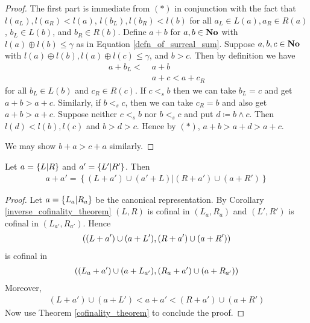 \begin{proof}
	The first part is immediate from $(*)$ in conjunction with the 
	fact that $l(a_L), l(a_R) < l(a)$, $l(b_L), l(b_R) < l(b)$
	for all $a_L \in L(a), a_R \in R(a)$, $b_L \in L(b)$, and 
	$b_R \in R(b)$. 
Define $a + b$ for $a, b \in \mathbf{No}$ with $l(a) \oplus l(b) \leq 
\gamma$ as in Equation \ref{defn_of_surreal_sum}. Suppose 
$a, b, c \in \mathbf{No}$ with $l(a) \oplus l(b), l(a) \oplus l(c) \leq 
\gamma$, and $b > c$. Then by definition we have 
\begin{align*}
	a + b_L < \;& a + b \\
	& a + c < a + c_R
\end{align*}
for all $b_L \in L(b)$ and $c_R \in R(c)$. If $c <_s b$ then 
we can take $b_L = c$ and get $a + b > a + c$. Similarly, if 
$b <_s c$, then we can take $c_R = b$ and also get $a + b > a + c$. 
Suppose neither $c <_s b$ nor $b <_s c$ and put 
$d \coloneq b \wedge c$. Then $l(d) < l(b), l(c)$ and 
$b > d > c$. Hence by $(*)$, $a + b > a + d > a + c$. 

We may show $b + a > c + a$ similarly. 
\end{proof}
\begin{lem}
	Let $a = \left\{ L \vert R \right\}$ and $a' = \left\{ L' \vert R' \right\}$. 
	Then
	\begin{align*}
		a + a' = 
		\left\{ (L + a') \cup (a' + L) \vert 
		(R + a') \cup (a + R') \right\}
	\end{align*}
\end{lem}
\begin{proof}
	Let $a = \left\{ L_a \vert R_a \right\}$ be the canonical 
	representation. By Corollary \ref{inverse_cofinality_theorem}
	$(L, R)$ is cofinal in $(L_a, R_a)$ and $(L', R')$ is 
	cofinal in $(L_{a'}, R_{a'})$. Hence 
	\begin{align*}
		\left( (L + a') \cup (a + L'), (R+a') \cup (a + R') \right)
	\end{align*}
	is cofinal in 
	\begin{align*}
		\left( (L_a + a') \cup (a + L_{a'}), (R_a + a') \cup 
		(a + R_{a'}) \right)
	\end{align*}
	Moreover, 
	\begin{align*}
		(L + a') \cup (a + L') < a + a' < 
		(R + a') \cup (a + R')
	\end{align*}
	Now use Theorem \ref{cofinality_theorem} to conclude the 
	proof. 
\end{proof}
